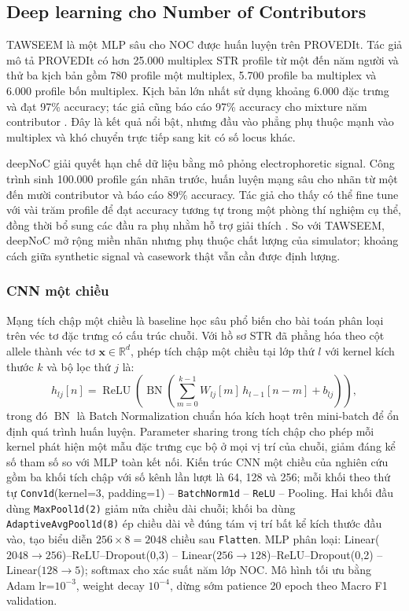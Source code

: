 \documentclass[12pt,a4paper]{article}
\begin{document}
\subsection{Deep learning cho Number of Contributors}

TAWSEEM là một MLP sâu cho NOC được huấn luyện trên PROVEDIt. Tác giả mô tả PROVEDIt có hơn 25.000 multiplex STR profile từ một đến năm người và thử ba kịch bản gồm 780 profile một multiplex, 5.700 profile ba multiplex và 6.000 profile bốn multiplex. Kịch bản lớn nhất sử dụng khoảng 6.000 đặc trưng và đạt 97\% accuracy; tác giả cũng báo cáo 97\% accuracy cho mixture năm contributor \cite{alamoudi2022}. Đây là kết quả nổi bật, nhưng đầu vào phẳng phụ thuộc mạnh vào multiplex và khó chuyển trực tiếp sang kit có số locus khác.

deepNoC giải quyết hạn chế dữ liệu bằng mô phỏng electrophoretic signal. Công trình sinh 100.000 profile gán nhãn trước, huấn luyện mạng sâu cho nhãn từ một đến mười contributor và báo cáo 89\% accuracy. Tác giả cho thấy có thể fine tune với vài trăm profile để đạt accuracy tương tự trong một phòng thí nghiệm cụ thể, đồng thời bổ sung các đầu ra phụ nhằm hỗ trợ giải thích \cite{taylor2024deepnoc}. So với TAWSEEM, deepNoC mở rộng miền nhãn nhưng phụ thuộc chất lượng của simulator; khoảng cách giữa synthetic signal và casework thật vẫn cần được định lượng.

\subsubsection{CNN một chiều}

Mạng tích chập một chiều là baseline học sâu phổ biến cho bài toán phân loại trên véc tơ đặc trưng có cấu trúc chuỗi. Với hồ sơ STR đã phẳng hóa theo cột allele thành véc tơ $\bm{x} \in \mathbb{R}^d$, phép tích chập một chiều tại lớp thứ $l$ với kernel kích thước $k$ và bộ lọc thứ $j$ là:
\begin{equation}
h_{lj}[n] = \operatorname{ReLU}\!\left(\operatorname{BN}\!\left(\sum_{m=0}^{k-1} W_{lj}[m]\, h_{l-1}[n-m] + b_{lj}\right)\right),
\end{equation}
trong đó $\operatorname{BN}$ là Batch Normalization chuẩn hóa kích hoạt trên mini-batch để ổn định quá trình huấn luyện. Parameter sharing trong tích chập cho phép mỗi kernel phát hiện một mẫu đặc trưng cục bộ ở mọi vị trí của chuỗi, giảm đáng kể số tham số so với MLP toàn kết nối. Kiến trúc CNN một chiều của nghiên cứu gồm ba khối tích chập với số kênh lần lượt là 64, 128 và 256; mỗi khối theo thứ tự \texttt{Conv1d}(kernel=3, padding=1) -- \texttt{BatchNorm1d} -- \texttt{ReLU} -- Pooling. Hai khối đầu dùng \texttt{MaxPool1d(2)} giảm nửa chiều dài chuỗi; khối ba dùng \texttt{AdaptiveAvgPool1d(8)} ép chiều dài về đúng tám vị trí bất kể kích thước đầu vào, tạo biểu diễn $256\times8=2048$ chiều sau \texttt{Flatten}. MLP phân loại: Linear($2048\to256$)--ReLU--Dropout(0{,}3) -- Linear($256\to128$)--ReLU--Dropout(0{,}2) -- Linear($128\to5$); softmax cho xác suất năm lớp NOC. Mô hình tối ưu bằng Adam lr=$10^{-3}$, weight decay $10^{-4}$, dừng sớm patience 20 epoch theo Macro F1 validation.
\end{document}
